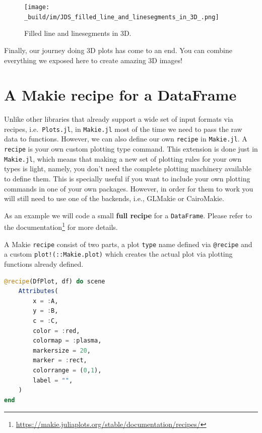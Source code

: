 \documentclass[
  notoc %
]{tufte-book}
\DeclareRobustCommand{\href}[2]{#2\footnote{\url{#1}}}
\newcommand{\passthrough}[1]{#1}
\begin{document}
\begin{figure}
\hypertarget{fig:filled_line_and_linesegments_in_3D}{%
\centering
\texttt{[image: \_build/im/JDS\_filled\_line\_and\_linesegments\_in\_3D\_.png]}
\caption{Filled line and linesegments in
3D.}\label{fig:filled_line_and_linesegments_in_3D}
}
\end{figure}

Finally, our journey doing 3D plots has come to an end. You can combine
everything we exposed here to create amazing 3D images!

\hypertarget{sec:recipe_df}{%
\section{A Makie recipe for a DataFrame}\label{sec:recipe_df}}

Unlike other libraries that already support a wide set of input formats
via recipes, i.e.~\passthrough{\lstinline!Plots.jl!}, in
\passthrough{\lstinline!Makie.jl!} most of the time we need to pass the
raw data to functions. However, we can also define our own
\passthrough{\lstinline!recipe!} in \passthrough{\lstinline!Makie.jl!}.
A \passthrough{\lstinline!recipe!} is your own custom plotting type
command. This extension is done just in
\passthrough{\lstinline!Makie.jl!}, which means that making a new set of
plotting rules for your own types is light, namely, you don't need the
complete plotting machinery available to define them. This is specially
useful if you want to include your own plotting commands in one of your
own packages. However, in order for them to work you will still need to
use one of the backends, i.e., GLMakie or CairoMakie.

As an example we will code a small \textbf{full recipe} for a
\passthrough{\lstinline!DataFrame!}. Please refer to the
\href{https://makie.juliaplots.org/stable/documentation/recipes/}{documentation}
for more details.

A Makie \passthrough{\lstinline!recipe!} consist of two parts, a plot
\passthrough{\lstinline!type!} name defined via
\passthrough{\lstinline!@recipe!} and a custom
\passthrough{\lstinline"plot!(::Makie.plot)"} which creates the actual
plot via plotting functions already defined.

\begin{lstlisting}[language=Julia]
@recipe(DfPlot, df) do scene
    Attributes(
        x = :A,
        y = :B,
        c = :C,
        color = :red,
        colormap = :plasma,
        markersize = 20,
        marker = :rect,
        colorrange = (0,1),
        label = "",
    )
end
\end{lstlisting}
\end{document}
